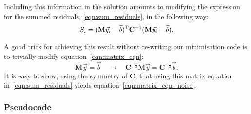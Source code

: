 \documentclass[letterpaper, 11pt]{article}
\begin{document}
Including this information in the solution amounts to modifying the expression for the summed residuals, \ref{eqn:sum_residuals}, in the following way:
\begin{equation}\label{eqn:matrix_eqn_noise}
	S_i = (\mathbf M \vec{y_i} - \vec b)^{\rm T}\mathbf{C}^{-1}(\mathbf M \vec{y_i} - \vec b).
\end{equation}

A good trick for achieving this result without re-writing our minimisation code is to trivially modify equation~\ref{eqn:matrix_eqn}:
\begin{equation}
	\mathbf M \vec y = \vec b \quad\longrightarrow\quad \mathbf{C}^{-\frac{1}{2}}\mathbf{M} \vec y = \mathbf{C}^{-\frac{1}{2}}\vec b.
\end{equation}
It is easy to show, using the symmetry of $\mathbf{C}$, that using this matrix equation in~\ref{eqn:sum_residuals} yields equation~\ref{eqn:matrix_eqn_noise}.



\subsubsection{Pseudocode}
\end{document}
